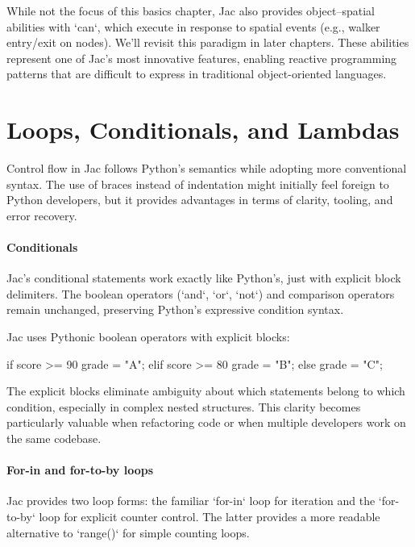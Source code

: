 While not the focus of this basics chapter, Jac also provides object–spatial abilities with `can`, which execute in response to spatial events (e.g., walker entry/exit on nodes). We'll revisit this paradigm in later chapters. These abilities represent one of Jac's most innovative features, enabling reactive programming patterns that are difficult to express in traditional object-oriented languages.

\section{Loops, Conditionals, and Lambdas}

Control flow in Jac follows Python's semantics while adopting more conventional syntax. The use of braces instead of indentation might initially feel foreign to Python developers, but it provides advantages in terms of clarity, tooling, and error recovery.

\paragraph{Conditionals}

Jac's conditional statements work exactly like Python's, just with explicit block delimiters. The boolean operators (`and`, `or`, `not`) and comparison operators remain unchanged, preserving Python's expressive condition syntax.

Jac uses Pythonic boolean operators with explicit blocks:

\begin{jacblock}
if score >= 90 {
    grade = "A";
} elif score >= 80 {
    grade = "B";
} else {
    grade = "C";
}
\end{jacblock}

The explicit blocks eliminate ambiguity about which statements belong to which condition, especially in complex nested structures. This clarity becomes particularly valuable when refactoring code or when multiple developers work on the same codebase.

\paragraph{For-in and for-to-by loops}

Jac provides two loop forms: the familiar `for-in` loop for iteration and the `for-to-by` loop for explicit counter control. The latter provides a more readable alternative to `range()` for simple counting loops.

